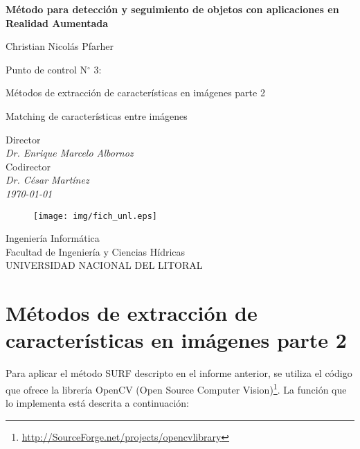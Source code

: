 \documentclass[a4paper,11pt,spanish]{article}
\begin{document}
\pagestyle{empty}
\begin{center}

	\bigskip
	\bigskip
	
	{\bf\Large Método para detección y seguimiento de objetos con aplicaciones en Realidad Aumentada} \\

	\bigskip
	\bigskip

	\large Christian Nicolás Pfarher\\


  	\bigskip
  	\bigskip
	
	Punto de control N$^{\circ}$ 3: \\	
		\begin{description}
			\item Métodos de extracción de características en imágenes parte 2
			\item Matching de características entre imágenes %
		\end{description}

	 
	\bigskip
	
	Director\\
	\textit{Dr. Enrique Marcelo Albornoz}\\
	\bigskip
	Codirector\\
	\textit{Dr. César Martínez}\\
	
	\bigskip
	\bigskip
	\bigskip
	\bigskip
	\bigskip
	\bigskip
	\textit{\today}\\
	

	\vfill
	\begin{figure}[tbhp]
		\centerline{\texttt{[image: img/fich\_unl.eps]}}
	\end{figure}
	
  	{Ingeniería Informática}\\
  	{Facultad de Ingeniería y Ciencias Hídricas}\\
    {UNIVERSIDAD NACIONAL DEL LITORAL}	
\end{center}

\bigskip
\bigskip

\newpage
\tableofcontents
\newpage
\pagestyle{plain}
\section{Métodos de extracción de características en imágenes parte 2}
\label{extraccion_caracteristicas}
Para aplicar el método SURF descripto en el informe anterior, se utiliza el código que ofrece la librería OpenCV (Open Source Computer Vision)\footnote{\url{http://SourceForge.net/projects/opencvlibrary}}. La funci\'on que lo implementa est\'a descrita a continuaci\'on:
\end{document}
